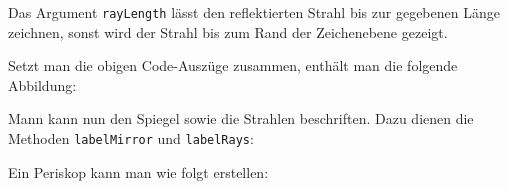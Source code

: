 Das Argument \texttt{rayLength} lässt den reflektierten Strahl bis zur gegebenen Länge zeichnen, 
sonst wird der Strahl bis zum Rand der Zeichenebene gezeigt.

Setzt man die obigen Code-Auszüge zusammen, enthält man die folgende Abbildung:


Mann kann nun den Spiegel sowie die Strahlen beschriften.
Dazu dienen die Methoden \texttt{labelMirror} und \texttt{labelRays}:


Ein Periskop kann man wie folgt erstellen:


